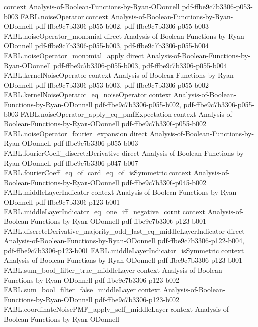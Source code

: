 \begin{theorem}
  {context}
  {Analysis-of-Boolean-Functions-by-Ryan-ODonnell}
  {pdf-ffbe9c7b3306-p053-b003}
\proofstep
  {FABL.noiseOperator}
  {context}
  {Analysis-of-Boolean-Functions-by-Ryan-ODonnell}
  {pdf-ffbe9c7b3306-p055-b002,
    pdf-ffbe9c7b3306-p055-b003}
\proofstep
  {FABL.noiseOperator_monomial}
  {direct}
  {Analysis-of-Boolean-Functions-by-Ryan-ODonnell}
  {pdf-ffbe9c7b3306-p055-b003,
    pdf-ffbe9c7b3306-p055-b004}
\proofstep
  {FABL.noiseOperator_monomial_apply}
  {direct}
  {Analysis-of-Boolean-Functions-by-Ryan-ODonnell}
  {pdf-ffbe9c7b3306-p055-b003,
    pdf-ffbe9c7b3306-p055-b004}
\proofstep
  {FABL.kernelNoiseOperator}
  {context}
  {Analysis-of-Boolean-Functions-by-Ryan-ODonnell}
  {pdf-ffbe9c7b3306-p053-b003,
    pdf-ffbe9c7b3306-p055-b002}
\proofstep
  {FABL.kernelNoiseOperator_eq_noiseOperator}
  {context}
  {Analysis-of-Boolean-Functions-by-Ryan-ODonnell}
  {pdf-ffbe9c7b3306-p055-b002,
    pdf-ffbe9c7b3306-p055-b003}
\proofstep
  {FABL.noiseOperator_apply_eq_pmfExpectation}
  {context}
  {Analysis-of-Boolean-Functions-by-Ryan-ODonnell}
  {pdf-ffbe9c7b3306-p055-b002}
\proofstep
  {FABL.noiseOperator_fourier_expansion}
  {direct}
  {Analysis-of-Boolean-Functions-by-Ryan-ODonnell}
  {pdf-ffbe9c7b3306-p055-b003}
\proofstep
  {FABL.fourierCoeff_discreteDerivative}
  {direct}
  {Analysis-of-Boolean-Functions-by-Ryan-ODonnell}
  {pdf-ffbe9c7b3306-p047-b007}
\proofstep
  {FABL.fourierCoeff_eq_of_card_eq_of_isSymmetric}
  {context}
  {Analysis-of-Boolean-Functions-by-Ryan-ODonnell}
  {pdf-ffbe9c7b3306-p045-b002}
\proofstep
  {FABL.middleLayerIndicator}
  {context}
  {Analysis-of-Boolean-Functions-by-Ryan-ODonnell}
  {pdf-ffbe9c7b3306-p123-b001}
\proofstep
  {FABL.middleLayerIndicator_eq_one_iff_negative_count}
  {context}
  {Analysis-of-Boolean-Functions-by-Ryan-ODonnell}
  {pdf-ffbe9c7b3306-p123-b001}
\proofstep
  {FABL.discreteDerivative_majority_odd_last_eq_middleLayerIndicator}
  {direct}
  {Analysis-of-Boolean-Functions-by-Ryan-ODonnell}
  {pdf-ffbe9c7b3306-p122-b004,
    pdf-ffbe9c7b3306-p123-b001}
\proofstep
  {FABL.middleLayerIndicator_isSymmetric}
  {context}
  {Analysis-of-Boolean-Functions-by-Ryan-ODonnell}
  {pdf-ffbe9c7b3306-p123-b001}
\proofstep
  {FABL.sum_bool_filter_true_middleLayer}
  {context}
  {Analysis-of-Boolean-Functions-by-Ryan-ODonnell}
  {pdf-ffbe9c7b3306-p123-b002}
\proofstep
  {FABL.sum_bool_filter_false_middleLayer}
  {context}
  {Analysis-of-Boolean-Functions-by-Ryan-ODonnell}
  {pdf-ffbe9c7b3306-p123-b002}
\proofstep
  {FABL.coordinateNoisePMF_apply_self_middleLayer}
  {context}
  {Analysis-of-Boolean-Functions-by-Ryan-ODonnell}

\end{theorem}
